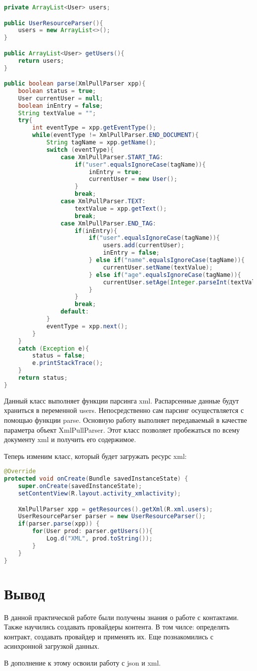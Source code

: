 \begin{lstlisting}[language=Java
	, label=lst:
	]
private ArrayList<User> users;

public UserResourceParser(){
	users = new ArrayList<>();
}

public ArrayList<User> getUsers(){
	return users;
}

public boolean parse(XmlPullParser xpp){
	boolean status = true;
	User currentUser = null;
	boolean inEntry = false;
	String textValue = "";
	try{
		int eventType = xpp.getEventType();
		while(eventType != XmlPullParser.END_DOCUMENT){
			String tagName = xpp.getName();
			switch (eventType){
				case XmlPullParser.START_TAG:
					if("user".equalsIgnoreCase(tagName)){
						inEntry = true;
						currentUser = new User();
					}
					break;
				case XmlPullParser.TEXT:
					textValue = xpp.getText();
					break;
				case XmlPullParser.END_TAG:
					if(inEntry){
						if("user".equalsIgnoreCase(tagName)){
							users.add(currentUser);
							inEntry = false;
						} else if("name".equalsIgnoreCase(tagName)){
							currentUser.setName(textValue);
						} else if("age".equalsIgnoreCase(tagName)){
							currentUser.setAge(Integer.parseInt(textValue));
						}
					}
					break;
				default:
			}
			eventType = xpp.next();
		}
	}
	catch (Exception e){
		status = false;
		e.printStackTrace();
	}
	return status;
}
\end{lstlisting}

Данный класс выполняет функции парсинга xml. Распарсенные данные будут
храниться в переменной users. Непосредственно сам парсинг осуществляется
с помощью функции parse. Основную работу выполняет передаваемый в
качестве параметра объект XmlPullParser. Этот класс позволяет пробежаться
по всему документу xml и получить его содержимое.\par
Теперь изменим класс, который будет загружать ресурс xml:

\begin{lstlisting}[language=Java
	, label=lst:
	]
@Override
protected void onCreate(Bundle savedInstanceState) {
	super.onCreate(savedInstanceState);
	setContentView(R.layout.activity_xmlactivity);

	XmlPullParser xpp = getResources().getXml(R.xml.users);
	UserResourceParser parser = new UserResourceParser();
	if(parser.parse(xpp)) {
		for(User prod: parser.getUsers()){
			Log.d("XML", prod.toString());
		}
	}
}
\end{lstlisting}

\clearpage

\section*{\LARGE{Вывод}}
В данной практической работе были получены знания о работе с контактами.
Также научились создавать провайдеры контента. В том чилсе:
определять контракт, создавать провайдер и применять их. Еще познакомились
с асинхронной загрузкой данных.\par
В дополнение к этому освоили работу с json и xml.


